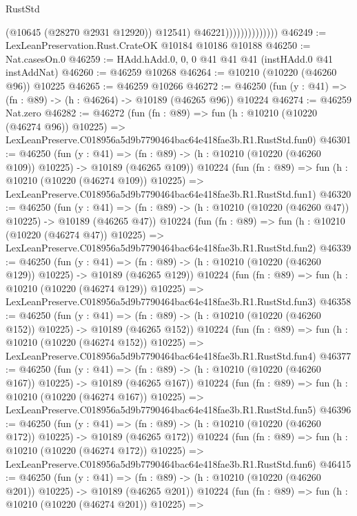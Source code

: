 \begin{lexlean}{RustStd}
\begin{coremodule}
                                  (@10645 (@28270 @2931 @12920))
                                  @12541)
                                @46221))))))))))))))
@46249 := LexLeanPreservation.Rust.CrateOK @10184 @10186 @10188
@46250 := Nat.casesOn.{0}
@46259 := HAdd.hAdd.{0, 0, 0} @41 @41 @41 (instHAdd.{0} @41 instAddNat)
@46260 := @46259 @10268
@46264 := @10210 (@10220 (@46260 @96)) @10225
@46265 := @46259 @10266
@46272 := @46250 (fun (y : @41) => (fn : @89) -> (h : @46264) -> @10189 (@46265 @96)) @10224
@46274 := @46259 Nat.zero
@46282 := @46272
    (fun (fn : @89) =>
    fun (h : @10210 (@10220 (@46274 @96)) @10225) =>
    LexLeanPreserve.C018956a5d9b7790464bac64e418fae3b.R1.RustStd.fun0)
@46301 := @46250
    (fun (y : @41) =>
    (fn : @89) -> (h : @10210 (@10220 (@46260 @109)) @10225) -> @10189 (@46265 @109))
    @10224
    (fun (fn : @89) =>
    fun (h : @10210 (@10220 (@46274 @109)) @10225) =>
    LexLeanPreserve.C018956a5d9b7790464bac64e418fae3b.R1.RustStd.fun1)
@46320 := @46250
    (fun (y : @41) =>
    (fn : @89) -> (h : @10210 (@10220 (@46260 @47)) @10225) -> @10189 (@46265 @47))
    @10224
    (fun (fn : @89) =>
    fun (h : @10210 (@10220 (@46274 @47)) @10225) =>
    LexLeanPreserve.C018956a5d9b7790464bac64e418fae3b.R1.RustStd.fun2)
@46339 := @46250
    (fun (y : @41) =>
    (fn : @89) -> (h : @10210 (@10220 (@46260 @129)) @10225) -> @10189 (@46265 @129))
    @10224
    (fun (fn : @89) =>
    fun (h : @10210 (@10220 (@46274 @129)) @10225) =>
    LexLeanPreserve.C018956a5d9b7790464bac64e418fae3b.R1.RustStd.fun3)
@46358 := @46250
    (fun (y : @41) =>
    (fn : @89) -> (h : @10210 (@10220 (@46260 @152)) @10225) -> @10189 (@46265 @152))
    @10224
    (fun (fn : @89) =>
    fun (h : @10210 (@10220 (@46274 @152)) @10225) =>
    LexLeanPreserve.C018956a5d9b7790464bac64e418fae3b.R1.RustStd.fun4)
@46377 := @46250
    (fun (y : @41) =>
    (fn : @89) -> (h : @10210 (@10220 (@46260 @167)) @10225) -> @10189 (@46265 @167))
    @10224
    (fun (fn : @89) =>
    fun (h : @10210 (@10220 (@46274 @167)) @10225) =>
    LexLeanPreserve.C018956a5d9b7790464bac64e418fae3b.R1.RustStd.fun5)
@46396 := @46250
    (fun (y : @41) =>
    (fn : @89) -> (h : @10210 (@10220 (@46260 @172)) @10225) -> @10189 (@46265 @172))
    @10224
    (fun (fn : @89) =>
    fun (h : @10210 (@10220 (@46274 @172)) @10225) =>
    LexLeanPreserve.C018956a5d9b7790464bac64e418fae3b.R1.RustStd.fun6)
@46415 := @46250
    (fun (y : @41) =>
    (fn : @89) -> (h : @10210 (@10220 (@46260 @201)) @10225) -> @10189 (@46265 @201))
    @10224
    (fun (fn : @89) =>
    fun (h : @10210 (@10220 (@46274 @201)) @10225) =>

\end{coremodule}
\end{lexlean}
